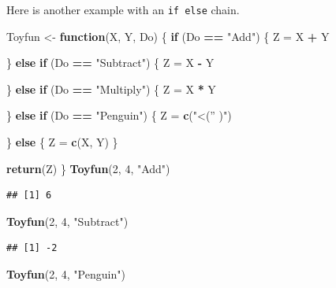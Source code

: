 \documentclass[
]{book}
\newenvironment{Shaded}{\begin{snugshade}}{\end{snugshade}}
\newcommand{\ControlFlowTok}[1]{\textcolor[rgb]{0.13,0.29,0.53}{\textbf{#1}}}
\newcommand{\DecValTok}[1]{\textcolor[rgb]{0.00,0.00,0.81}{#1}}
\newcommand{\KeywordTok}[1]{\textcolor[rgb]{0.13,0.29,0.53}{\textbf{#1}}}
\newcommand{\NormalTok}[1]{#1}
\newcommand{\OperatorTok}[1]{\textcolor[rgb]{0.81,0.36,0.00}{\textbf{#1}}}
\newcommand{\StringTok}[1]{\textcolor[rgb]{0.31,0.60,0.02}{#1}}
\begin{document}
Here is another example with an \texttt{if\ else} chain.

\begin{Shaded}
\begin{Highlighting}[]
\NormalTok{Toyfun <-}\StringTok{ }\ControlFlowTok{function}\NormalTok{(X, Y, Do) \{}
    \ControlFlowTok{if}\NormalTok{ (Do }\OperatorTok{==}\StringTok{ "Add"}\NormalTok{) \{}
\NormalTok{        Z =}\StringTok{ }\NormalTok{X }\OperatorTok{+}\StringTok{ }\NormalTok{Y}

\NormalTok{    \} }\ControlFlowTok{else} \ControlFlowTok{if}\NormalTok{ (Do }\OperatorTok{==}\StringTok{ "Subtract"}\NormalTok{) \{}
\NormalTok{        Z =}\StringTok{ }\NormalTok{X }\OperatorTok{-}\StringTok{ }\NormalTok{Y}

\NormalTok{    \} }\ControlFlowTok{else} \ControlFlowTok{if}\NormalTok{ (Do }\OperatorTok{==}\StringTok{ "Multiply"}\NormalTok{) \{}
\NormalTok{        Z =}\StringTok{ }\NormalTok{X }\OperatorTok{*}\StringTok{ }\NormalTok{Y}

\NormalTok{    \} }\ControlFlowTok{else} \ControlFlowTok{if}\NormalTok{ (Do }\OperatorTok{==}\StringTok{ "Penguin"}\NormalTok{) \{}
\NormalTok{        Z =}\StringTok{ }\KeywordTok{c}\NormalTok{(}\StringTok{"<('' )"}\NormalTok{)}

\NormalTok{    \} }\ControlFlowTok{else}\NormalTok{ \{}
\NormalTok{        Z =}\StringTok{ }\KeywordTok{c}\NormalTok{(X, Y)}
\NormalTok{    \}}

    \KeywordTok{return}\NormalTok{(Z)}
\NormalTok{\}}
\KeywordTok{Toyfun}\NormalTok{(}\DecValTok{2}\NormalTok{, }\DecValTok{4}\NormalTok{, }\StringTok{"Add"}\NormalTok{)}
\end{Highlighting}
\end{Shaded}

\begin{verbatim}
## [1] 6
\end{verbatim}

\begin{Shaded}
\begin{Highlighting}[]
\KeywordTok{Toyfun}\NormalTok{(}\DecValTok{2}\NormalTok{, }\DecValTok{4}\NormalTok{, }\StringTok{"Subtract"}\NormalTok{)}
\end{Highlighting}
\end{Shaded}

\begin{verbatim}
## [1] -2
\end{verbatim}

\begin{Shaded}
\begin{Highlighting}[]
\KeywordTok{Toyfun}\NormalTok{(}\DecValTok{2}\NormalTok{, }\DecValTok{4}\NormalTok{, }\StringTok{"Penguin"}\NormalTok{)}
\end{Highlighting}
\end{Shaded}
\end{document}
